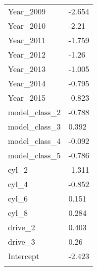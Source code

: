 \begin{table}[!htbp]
\begin{tabular}{@{}ll@{}}
Year\_2009      & -2.654    \\
Year\_2010      & -2.21     \\
Year\_2011      & -1.759    \\
Year\_2012      & -1.26     \\
Year\_2013      & -1.005    \\
Year\_2014      & -0.795    \\
Year\_2015      & -0.823    \\
model\_class\_2 & -0.788    \\
model\_class\_3 & 0.392     \\
model\_class\_4 & -0.092    \\
model\_class\_5 & -0.786    \\
cyl\_2          & -1.311    \\
cyl\_4          & -0.852    \\
cyl\_6          & 0.151     \\
cyl\_8          & 0.284     \\
drive\_2        & 0.403     \\
drive\_3        & 0.26      \\
Intercept       & -2.423    \\
\\
\bottomrule
\end{tabular}
\end{table}
